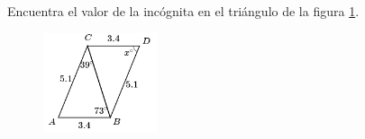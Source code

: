 \question[10]  Encuentra el valor de la incógnita en el triángulo de la figura \ref{fig:angle_triangle_22}.
\begin{figure}[H]
    \begin{center}
        \includegraphics[width=0.3\textwidth]{../images/angle_triangle_22.png}
    \end{center}
    \caption{}
    \label{fig:angle_triangle_22}
\end{figure}